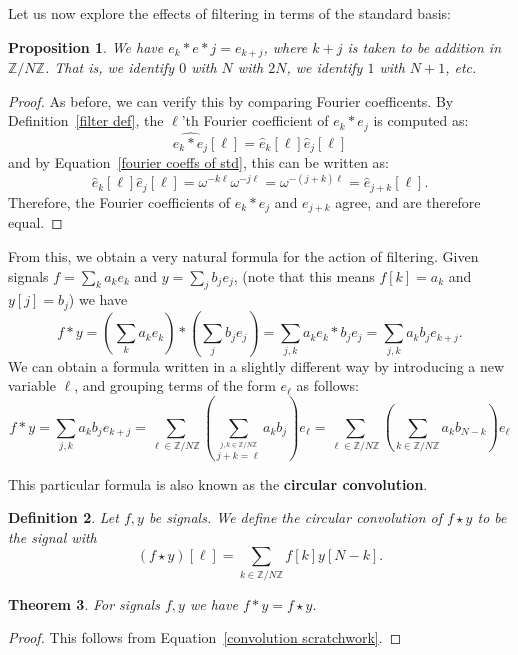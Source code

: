 \documentclass[12pt]{report}
\theoremstyle{plain}
\newtheorem{thm}{Theorem}[section]
\newtheorem{defn}[thm]{Definition}
\newtheorem{prop}[thm]{Proposition}
\begin{document}
Let us now explore the effects of filtering in terms of the standard basis:
\begin{prop}
We have $e_k * e*j = e_{k+j}$, where $k + j$ is taken to be addition in $\mathbb Z/N\mathbb Z$. That is, we identify $0$ with $N$ with $2N$, we identify $1$ with $N+1$, etc.
\end{prop}
\begin{proof}
As before, we can verify this by comparing Fourier coefficents. By Definition~\ref{filter def}, the $\ell$'th Fourier coefficient of $e_k * e_j$ is computed as:
\[\widehat{e_k * e_j}[\ell] = \hat e_k[\ell] \hat e_j[\ell]\]
and by Equation~\ref{fourier coeffs of std}, this can be written as:
\[\hat e_k[\ell] \hat e_j[\ell] = \omega^{-k\ell} \omega^{-j\ell} = \omega^{-(j + k)\ell} = \hat e_{j+k}[\ell].\]
Therefore, the Fourier coefficients of $e_k * e_j$ and $e_{j+k}$ agree, and are therefore equal.
\end{proof}

From this, we obtain a very natural formula for the action of filtering. Given signals $f = \sum_k a_k e_k$ and $y = \sum_j b_j e_j$, (note that this means $f[k] = a_k$ and $y[j] = b_j$) we have
\[f * y = \left(\sum_k a_k e_k\right)*\left(\sum_j b_j e_j\right) = \sum_{j,k} a_k e_k * b_j e_j = \sum_{j,k} a_k b_j e_{k + j}.\]
We can obtain a formula written in a slightly different way by introducing a new variable $\ell$, and grouping terms of the form $e_\ell$ as follows:
\begin{equation} \label{convolution scratchwork}
f*y = \sum_{j,k}a_k b_j e_{k + j} = \sum_{\ell \in \mathbb Z/N\mathbb Z} \left(\sum_{\overset{j, k \in \mathbb Z/N\mathbb Z}{j + k = \ell}} a_k b_j\right)e_{\ell} = \sum_{\ell \in \mathbb Z/N\mathbb Z} \left(\sum_{k \in \mathbb Z/N\mathbb Z} a_kb_{N-k}\right)e_\ell
\end{equation}

This particular formula is also known as the \textbf{circular convolution}.

\begin{defn}
Let $f, y$ be signals. We define the circular convolution of $f \star y$ to be the signal with
\[(f \star y)[\ell] = \sum_{k\in \mathbb Z/N\mathbb Z} f[k]y[N-k].\]
\end{defn}

\begin{thm}
For signals $f, y$ we have $f * y = f \star y$.
\end{thm}
\begin{proof}
This follows from Equation~\ref{convolution scratchwork}.
\end{proof}
\end{document}
